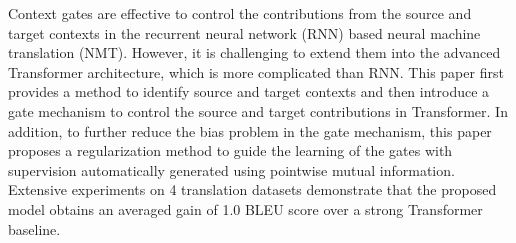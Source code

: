 Context gates are effective to control the contributions from the source and target contexts in the recurrent neural network (RNN) based neural machine translation (NMT). However, it is challenging to extend them into the advanced Transformer architecture, which is more complicated than RNN. This paper first provides a method to identify source and target contexts and then introduce a gate mechanism to control the source and target contributions in Transformer. In addition, to further reduce the bias problem in the gate mechanism, this paper proposes a regularization method to guide the learning of the gates with supervision automatically generated using pointwise mutual information. Extensive experiments on 4 translation datasets demonstrate that the proposed model obtains an averaged gain of 1.0 BLEU score over a strong Transformer baseline.
